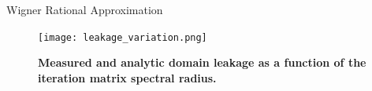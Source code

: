 \documentclass{beamer}
\begin{document}
\begin{frame}{Wigner Rational Approximation}

  \begin{figure}[t!]
    \begin{center}
      \texttt{[image: leakage\_variation.png]}
    \end{center}
    \caption{\textbf{Measured and analytic domain leakage as a function
        of the iteration matrix spectral radius.}}
    \label{fig:leakage_variation}
  \end{figure}

\end{frame}

\end{document}
